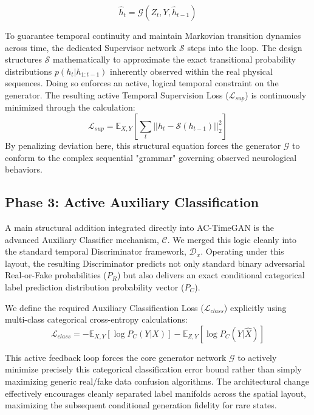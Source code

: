 \documentclass[journal,10pt,twocolumn]{IEEEtran}
\begin{document}
\begin{equation}
    \hat{h}_t = \mathcal{G}(Z_t, Y, \hat{h}_{t-1})
\end{equation}

To guarantee temporal continuity and maintain Markovian transition dynamics across time, the dedicated Supervisor network $\mathcal{S}$ steps into the loop. The design structures $\mathcal{S}$ mathematically to approximate the exact transitional probability distributions $p(h_t | h_{1:t-1})$ inherently observed within the real physical sequences. Doing so enforces an active, logical temporal constraint on the generator. The resulting active Temporal Supervision Loss ($\mathcal{L}_{sup}$) is continuously minimized through the calculation:
\begin{equation}
    \mathcal{L}_{sup} =  \mathbb{E}_{X,Y} \left[ \sum_{t} || h_t - \mathcal{S}(h_{t-1}) ||_2^2 \right]
\end{equation}
By penalizing deviation here, this structural equation forces the generator $\mathcal{G}$ to conform to the complex sequential "grammar" governing observed neurological behaviors.

\subsection{Phase 3: Active Auxiliary Classification}
A main structural addition integrated directly into AC-TimeGAN is the advanced Auxiliary Classifier mechanism, $\mathcal{C}$. We merged this logic cleanly into the standard temporal Discriminator framework, $\mathcal{D}_x$. Operating under this layout, the resulting Discriminator predicts not only standard binary adversarial Real-or-Fake probabilities ($P_R$) but also delivers an exact conditional categorical label prediction distribution probability vector ($P_C$).

We define the required Auxiliary Classification Loss ($\mathcal{L}_{class}$) explicitly using multi-class categorical cross-entropy calculations:
\begin{equation}
    \mathcal{L}_{class} = - \mathbb{E}_{X,Y}[\log P_C(Y|X)] - \mathbb{E}_{Z,Y}[\log P_C(Y|\hat{X})]
\end{equation}

This active feedback loop forces the core generator network $\mathcal{G}$ to actively minimize precisely this categorical classification error bound rather than simply maximizing generic real/fake data confusion algorithms. The architectural change effectively encourages cleanly separated label manifolds across the spatial layout, maximizing the subsequent conditional generation fidelity for rare states.
\end{document}
